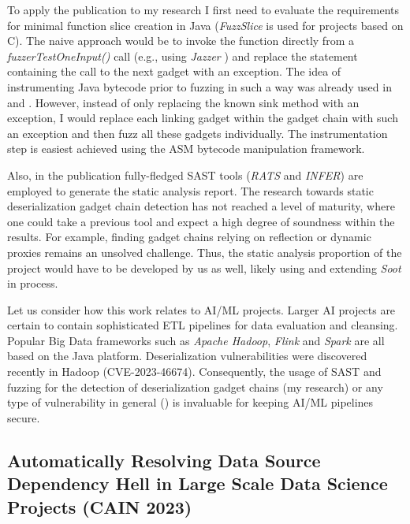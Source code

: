 \documentclass[11pt]{article}
\begin{document}
To apply the publication to my research I first need to evaluate the requirements for minimal function slice creation in Java (\textit{FuzzSlice} is used for projects based on C). The naive approach would be to invoke the function directly from a \textit{fuzzerTestOneInput()} call (e.g., using \textit{Jazzer} \cite{codeintelligencetesting-no-date}) and replace the statement containing the call to the next gadget with an exception. The idea of instrumenting Java bytecode prior to fuzzing in such a way was already used in \cite{srivastava_crystallizer_2023} and \cite{rasheed_hybrid_2021}. However, instead of only replacing the known sink method with an exception, I would replace each linking gadget within the gadget chain with such an exception and then fuzz all these gadgets individually. The instrumentation step is easiest achieved using the ASM bytecode manipulation framework.

Also, in the publication fully-fledged SAST tools (\textit{RATS} and \textit{INFER}) are employed to generate the static analysis report. The research towards static deserialization gadget chain detection has not reached a level of maturity, where one could take a previous tool and expect a high degree of soundness within the results. For example, finding gadget chains relying on reflection or dynamic proxies remains an unsolved challenge. Thus, the static analysis proportion of the project would have to be developed by us as well, likely using and extending \textit{Soot} in process.

Let us consider how this work relates to AI/ML projects. Larger AI projects are certain to contain sophisticated ETL pipelines for data evaluation and cleansing. Popular Big Data frameworks such as \textit{Apache Hadoop}, \textit{Flink} and \textit{Spark} are all based on the Java platform. Deserialization vulnerabilities were discovered recently in Hadoop (CVE-2023-46674). Consequently, the usage of SAST and fuzzing for the detection of deserialization gadget chains (my research) or any type of vulnerability in general (\cite{fuzzslice}) is invaluable for keeping AI/ML pipelines secure.





\subsection{Automatically Resolving Data Source Dependency Hell in Large Scale Data Science Projects (CAIN 2023)  \cite{datahell}}
\end{document}

